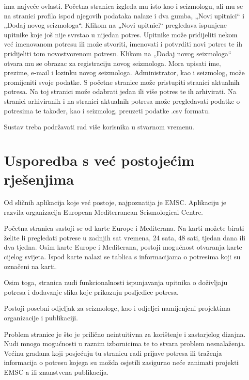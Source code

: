  ima najveće ovlasti. Početna stranica izgleda mu isto kao i seizmologu, ali mu se na stranici profila ispod njegovih podataka nalaze i dva gumba, „Novi upitnici“ i „Dodaj novog seizmologa“. Klikom na „Novi upitnici“ pregledava ispunjene upitnike koje još nije svrstao u nijedan potres. Upitnike može pridijeliti nekom već imenovanom potresu ili može stvoriti, imenovati i potvrditi novi potres te ih pridijeliti tom novostvorenom potresu. Klikom na „Dodaj novog seizmologa“ otvara mu se obrazac za registraciju novog seizmologa. Mora upisati ime, prezime, e-mail i lozinku novog seizmologa. Administrator, kao i seizmolog, može promijeniti svoje podatke. S početne stranice može pristupiti stranici aktualnih potresa. Na toj stranici može odabrati jedan ili više potres te ih arhivirati. Na stranici arhiviranih i na stranici aktualnih potresa može pregledavati podatke o potresima te također, kao i seizmolog, preuzeti podatke .csv formatu.

Sustav treba podržavati rad više korisnika u stvarnom vremenu.\\



\section{Usporedba s već postojećim rješenjima}

{Od sličnih aplikacija koje već postoje, najpoznatija je EMSC. Aplikaciju je razvila organizacija European Mediterranean Seismological Centre.
	
Početna stranica sastoji se od karte Europe i Mediterana. Na karti možete birati želite li pregledati potrese u zadnjih sat  vremena, 24 sata, 48 sati, tjedan dana ili dva tjedna. Osim karte Europe i Mediterana, postoji mogućnost otvaranja karte cijelog svijeta.
Ispod karte nalazi se tablica s informacijama o potresima koji su označeni na karti.

Osim toga, stranica nudi funkcionalnosti ispunjavanja upitnika o doživljaju potresa i dodavanje slika koje prikazuju posljedice potresa.

Postoji posebni odjeljak za seizmologe, kao i odjeljci namijenjeni projektima organizacije i publikaciji.

Problem stranice je što je prilično neintuitivna za korištenje i zastarjelog dizajna. Nudi mnogo mogućnosti u raznim izbornicima te to stvara problem nesnalaženja. Većinu građana koji posjećuju tu stranicu radi prijave potresa ili traženja informacija o potresu kojega su možda osjetili zasigurno neće zanimati projekti EMSC-a ili znanstvena publikacija.}

